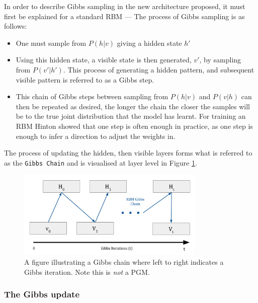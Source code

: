 In order to describe Gibbs sampling in the new architecture proposed, it must first be explained for a standard RBM --- The process of Gibbs sampling is as follows:
  \begin{itemize}
    \item One must sample from $P(h|v)$ giving a hidden state $h'$
    \item Using this hidden state, a visible state is then generated, $v'$, by sampling from $P(v'|h')$. This process of generating a hidden pattern, and subsequent visible pattern is referred to as a Gibbs step.
    \item This chain of Gibbs steps between sampling from $P(h|v)$ and $P(v|h)$ can then be repeated as desired, the longer the chain the closer the samples will be to the true joint distribution that the model has learnt. For training an RBM Hinton\cite{Hinton:2006:FLA:1161603.1161605} showed that one step is often enough in practice, as one step is enough to infer a direction to adjust the weights in.
  \end{itemize}
  The process of updating the hidden, then visible layers forms what is referred to as the \texttt{Gibbs Chain} and is visualised at layer level in Figure \ref{F:Gibbs_Chain}.
  \begin{figure}[h]
    \begin{center}
      \includegraphics[width=0.8\textwidth]{Assets/RBM-Gibbs-Chain.png}
    \end{center}
    \caption{A figure illustrating a Gibbs chain where left to right indicates a Gibbs iteration. Note this is \emph{not} a PGM.}
    \label{F:Gibbs_Chain}
  \end{figure}

  \subsubsection{The Gibbs update}\label{S:Gibbs-Update}

